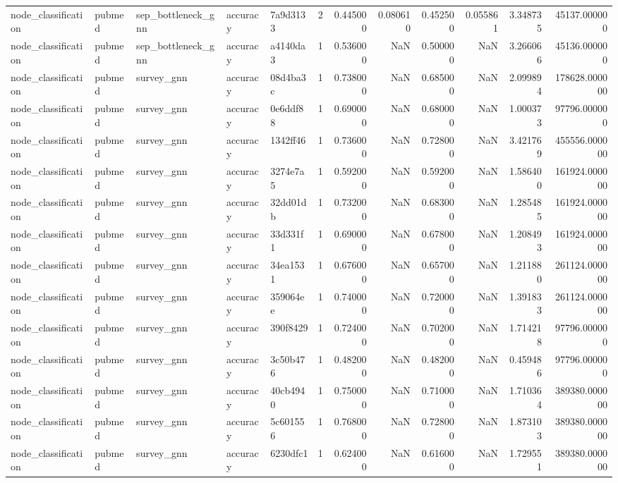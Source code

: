 \begin{tabular}{lllllrrrrrrr}
node_classification & pubmed & sep_bottleneck_gnn & accuracy & 7a9d3133 & 2 & 0.445000 & 0.080610 & 0.452500 & 0.055861 & 3.348735 & 45137.000000 \\
node_classification & pubmed & sep_bottleneck_gnn & accuracy & a4140da3 & 1 & 0.536000 & NaN & 0.500000 & NaN & 3.266066 & 45136.000000 \\
node_classification & pubmed & survey_gnn & accuracy & 08d4ba3c & 1 & 0.738000 & NaN & 0.685000 & NaN & 2.099894 & 178628.000000 \\
node_classification & pubmed & survey_gnn & accuracy & 0e6ddf88 & 1 & 0.690000 & NaN & 0.680000 & NaN & 1.000373 & 97796.000000 \\
node_classification & pubmed & survey_gnn & accuracy & 1342ff46 & 1 & 0.736000 & NaN & 0.728000 & NaN & 3.421769 & 455556.000000 \\
node_classification & pubmed & survey_gnn & accuracy & 3274e7a5 & 1 & 0.592000 & NaN & 0.592000 & NaN & 1.586400 & 161924.000000 \\
node_classification & pubmed & survey_gnn & accuracy & 32dd01db & 1 & 0.732000 & NaN & 0.683000 & NaN & 1.285485 & 161924.000000 \\
node_classification & pubmed & survey_gnn & accuracy & 33d331f1 & 1 & 0.690000 & NaN & 0.678000 & NaN & 1.208493 & 161924.000000 \\
node_classification & pubmed & survey_gnn & accuracy & 34ea1531 & 1 & 0.676000 & NaN & 0.657000 & NaN & 1.211880 & 261124.000000 \\
node_classification & pubmed & survey_gnn & accuracy & 359064ee & 1 & 0.740000 & NaN & 0.720000 & NaN & 1.391833 & 261124.000000 \\
node_classification & pubmed & survey_gnn & accuracy & 390f8429 & 1 & 0.724000 & NaN & 0.702000 & NaN & 1.714218 & 97796.000000 \\
node_classification & pubmed & survey_gnn & accuracy & 3c50b476 & 1 & 0.482000 & NaN & 0.482000 & NaN & 0.459486 & 97796.000000 \\
node_classification & pubmed & survey_gnn & accuracy & 40cb4940 & 1 & 0.750000 & NaN & 0.710000 & NaN & 1.710364 & 389380.000000 \\
node_classification & pubmed & survey_gnn & accuracy & 5c601556 & 1 & 0.768000 & NaN & 0.728000 & NaN & 1.873103 & 389380.000000 \\
node_classification & pubmed & survey_gnn & accuracy & 6230dfc1 & 1 & 0.624000 & NaN & 0.616000 & NaN & 1.729551 & 389380.000000 \\

\end{tabular}
